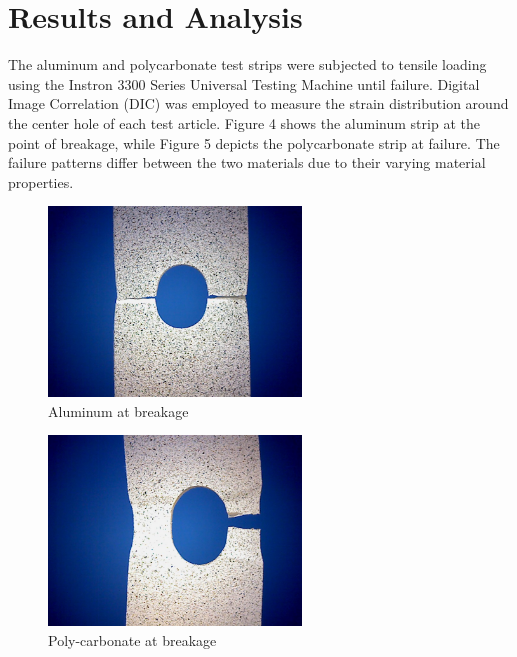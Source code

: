 \documentclass{article}
\begin{document}
\section{Results and Analysis}


The aluminum and polycarbonate test strips were subjected to tensile loading using the Instron 3300 Series Universal Testing Machine until failure. Digital Image Correlation (DIC) was employed to measure the strain distribution around the center hole of each test article. Figure 4 shows the aluminum strip at the point of breakage, while Figure 5 depicts the polycarbonate strip at failure. The failure patterns differ between the two materials due to their varying material properties.

\begin{figure}[H]
    \centering
    \includegraphics[width = 0.6\textwidth]{lab9images/aluminum_break.jpg}
    \caption{Aluminum at breakage}
    \label{fig:alfail}
\end{figure}

\begin{figure}[H]
    \centering
    \includegraphics[width = 0.6\textwidth]{lab9images/polycarbonate_break.jpg}
    \caption{Poly-carbonate at breakage}
    \label{fig:PCfail}
\end{figure}
\end{document}
